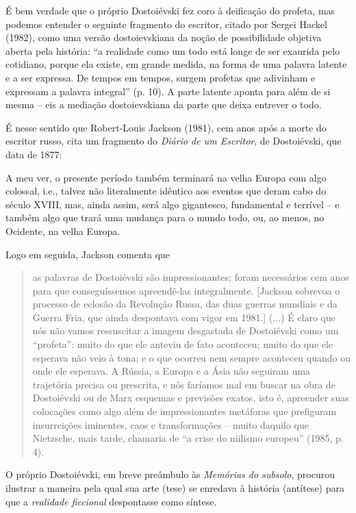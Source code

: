 É bem verdade que o próprio Dostoiévski fez coro à deificação do
profeta, mas podemos entender o seguinte fragmento do escritor, citado
por Sergei Hackel (1982), como uma versão dostoievskiana da noção de
possibilidade objetiva aberta pela história: ``a realidade como um todo
está longe de ser exaurida pelo cotidiano, porque ela existe, em grande
medida, na forma de uma palavra latente e a ser expressa. De tempos em
tempos, surgem profetas que adivinham e expressam a palavra integral''
(p. 10). A parte latente aponta para além de si mesma -- eis a mediação
dostoievskiana da parte que deixa entrever o todo.

É nesse sentido que Robert-Louis Jackson (1981), cem anos após a morte
do escritor russo, cita um fragmento do \emph{Diário de um Escritor}, de
Dostoiévski, que data de 1877:

A meu ver, o presente período também terminará na velha Europa com algo
colossal, i.e., talvez não literalmente idêntico aos eventos que deram
cabo do século XVIII, mas, ainda assim, será algo gigantesco,
fundamental e terrível -- e também algo que trará uma mudança para o
mundo todo, ou, ao menos, no Ocidente, na velha Europa.

Logo em seguida, Jackson comenta que

\begin{quote}
as palavras de Dostoiévski são impressionantes; foram necessários cem
anos para que conseguíssemos apreendê-las integralmente. {[}Jackson
sobrevoa o processo de eclosão da Revolução Russa, das duas guerras
mundiais e da Guerra Fria, que ainda despontava com vigor em 1981.{]}
(...) É claro que nós não vamos ressuscitar a imagem desgastada de
Dostoiévski como um ``profeta'': muito do que ele anteviu de fato
aconteceu; muito do que ele esperava não veio à tona; e o que ocorreu
nem sempre aconteceu quando ou onde ele esperava. A Rússia, a Europa e a
Ásia não seguiram uma trajetória precisa ou prescrita, e nós faríamos
mal em buscar na obra de Dostoiévski ou de Marx esquemas e previsões
exatos, isto é, apreender suas colocações como algo além de
impressionantes metáforas que prefiguram insurreições iminentes, caos e
transformações -- muito daquilo que Nietzsche, mais tarde, chamaria de
``a crise do niilismo europeu'' (1985, p. 4).
\end{quote}

O próprio Dostoiévski, em breve preâmbulo às \emph{Memórias do subsolo},
procurou ilustrar a maneira pela qual sua arte (tese) se enredava à
história (antítese) para que a \emph{realidade ficcional} despontasse
como síntese.

